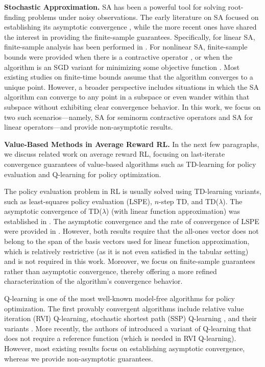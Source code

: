 \documentclass[11 pt]{article}
\begin{document}
	\textbf{Stochastic Approximation.} SA has been a powerful tool for solving root-finding problems under noisy observations. The early literature on SA focused on establishing its asymptotic convergence \cite{robbins1951stochastic,kushner2003stochastic,borkar2009stochastic,benveniste2012adaptive}, while the more recent ones have shared the interest in providing the finite-sample guarantees. Specifically, for linear SA, finite-sample analysis has been performed in \cite{srikant2019finite,mou2020linear,lakshminarayanan2018linear}. For nonlinear SA, finite-sample bounds were provided when there is a contractive operator \cite{chen2019finite,chen2021lyapunov,qu2020finite,mou2022optimal}, or when the algorithm is an SGD variant for minimizing some objective function \cite{bottou2010large,lan2020first,beck2017first}. Most existing studies on finite-time bounds assume that the algorithm converges to a unique point. However, a broader perspective includes situations in which the SA algorithm can converge to any point in a subspace or even wander within that subspace without exhibiting clear convergence behavior. In this work, we focus on two such scenarios—namely, SA for seminorm contractive operators and SA for linear operators—and provide non-asymptotic results.
	
	
	\textbf{Value-Based Methods in Average Reward RL.} 
	In the next few paragraphs, we discuss related work on average reward RL, focusing on last-iterate convergence guarantees of value-based algorithms such as TD-learning for policy evaluation and Q-learning for policy optimization.
	
	The policy evaluation problem in RL is usually solved using TD-learning variants, such as least-squares policy evaluation (LSPE), $ n $-step TD, and TD($\lambda$). The asymptotic convergence of TD($\lambda$) (with linear function approximation) was established in \cite{tsitsiklis1999average}. The asymptotic convergence and the rate of convergence of LSPE were provided in \cite{yu2009convergence}. However, both results require that the all-ones vector does not belong to the span of the basis vectors used for linear function approximation, which is relatively restrictive (as it is not even satisfied in the tabular setting) and is not required in this work. Moreover, we focus on finite-sample guarantees rather than asymptotic convergence, thereby offering a more refined characterization of the algorithm’s convergence behavior. 
	
	Q-learning is one of the most well-known model-free algorithms for policy optimization. The first provably convergent algorithms include relative value iteration (RVI) Q-learning, stochastic shortest path (SSP) Q-learning \cite{abounadi2001learning}, and their variants \cite{gosavi2004reinforcement}. More recently, the authors of \cite{wan2020learning} introduced a variant of Q-learning that does not require a reference function (which is needed in RVI Q-learning). However, most existing results focus on establishing asymptotic convergence, whereas we provide non-asymptotic guarantees.
	
\end{document}
